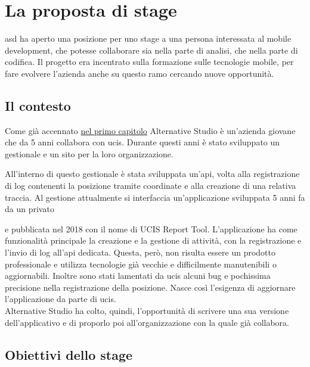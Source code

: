 
\section{La proposta di stage}

\gls{asd} ha aperto una posizione per uno stage a una persona interessata al mobile development, che potesse collaborare sia nella parte di analisi, che nella parte di codifica. Il progetto era incentrato sulla formazione sulle tecnologie mobile, per fare evolvere l'azienda anche su questo ramo cercando nuove opportunità.

\subsection{Il contesto}

Come già accennato {\hyperref[cap:introduzione]{nel primo capitolo}} Alternative Studio è un'azienda giovane che da 5 anni collabora con \gls{ucis}. Durante questi anni è stato sviluppato un gestionale e un sito per la loro organizzazione.


All'interno di questo gestionale è stata sviluppata un'\gls{api}, volta alla registrazione di log contenenti la posizione tramite coordinate e alla creazione di una relativa traccia. Al gestione attualmente si interfaccia un'applicazione sviluppata 5 anni fa da un privato


e pubblicata nel 2018 con il nome di UCIS Report Tool. L'applicazione ha come funzionalità principale la creazione e la gestione di attività, con la registrazione e l'invio di log all'\gls{api} dedicata. Questa, però, non risulta essere un prodotto professionale e utilizza tecnologie già vecchie e difficilmente manutenibili o aggiornabili. Inoltre sono stati lamentati da \gls{ucis} alcuni bug e pochissima precisione nella registrazione della posizione. Nasce così l'esigenza di aggiornare l'applicazione da parte di \gls{ucis}. \\
\noindent Alternative Studio ha colto, quindi, l'opportunità di scrivere una sua versione dell'applicativo e di proporlo poi all'organizzazione con la quale già collabora.

\subsection{Obiettivi dello stage}

